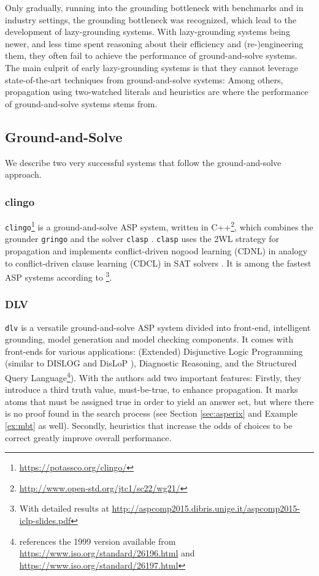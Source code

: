 \documentclass{vutinfth} %
\newcommand{\mbt}{must-be-true\xspace}
\newcommand{\clasp}{\texttt{clasp}\xspace}
\newcommand{\dlv}{\texttt{dlv}\xspace}
\begin{document}
Only gradually, running into the grounding bottleneck with benchmarks and in industry settings, the grounding bottleneck was recognized, which lead to the development of lazy-grounding systems. With lazy-grounding systems being newer, and less time spent reasoning about their efficiency and (re-)engineering them, they often fail to achieve the performance of ground-and-solve systems. The main culprit of early lazy-grounding systems is that they cannot leverage state-of-the-art techniques from ground-and-solve systems: Among others, propagation using two-watched literals and heuristics are where the performance of ground-and-solve systems stems from.

\subsection{Ground-and-Solve}

We describe two very successful systems that follow the ground-and-solve approach.

\subsubsection{clingo}

\texttt{clingo}\footnote{\url{https://potassco.org/clingo/}} is a ground-and-solve ASP system, written in C++\footnote{\url{http://www.open-std.org/jtc1/sc22/wg21/}}, which combines the grounder \texttt{gringo} and the solver \texttt{clasp} \cite{clasp-first}. \clasp uses the 2WL strategy for propagation \cite[Sec.~5.3]{clasp} and implements conflict-driven nogood learning (CDNL) \cite[Sec.~4.1]{clasp} in analogy to conflict-driven clause learning (CDCL) in SAT solvers \cite{grasp,cdl-sat}. It is among the fastest ASP systems according to \cite{aspcomp2015}\footnote{With detailed results at \url{http://aspcomp2015.dibris.unige.it/aspcomp2015-iclp-slides.pdf}}.

\subsubsection{DLV}

\dlv \cite{dlv} is a versatile ground-and-solve ASP system divided into front-end, intelligent grounding, model generation and model checking components. It comes with front-ends for various applications: (Extended) Disjunctive Logic Programming \cite{dlp} (similar to DISLOG \cite{dislog} and DisLoP \cite{dislop}), Diagnostic Reasoning, and the Structured Query Language\footnote{\cite{dlv} references the 1999 version available from \url{https://www.iso.org/standard/26196.html} and \url{https://www.iso.org/standard/26197.html}}). With \cite{dlv-mbt} the authors add two important features: Firstly, they introduce a third truth value, \mbt, to enhance propagation. It marks atoms that must be assigned true in order to yield an answer set, but where there is no proof found in the search process (see Section \ref{sec:asperix} and Example \ref{ex:mbt} as well). Secondly, heuristics that increase the odds of choices to be correct greatly improve overall performance.
\end{document}
